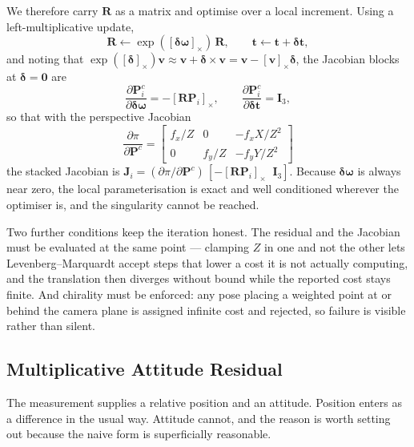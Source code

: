 We therefore carry $\mathbf{R}$ as a matrix and optimise over a local
increment. Using a left-multiplicative update,
\begin{equation}
\mathbf{R} \leftarrow \exp([\boldsymbol{\delta\omega}]_\times)\,\mathbf{R},
\qquad
\mathbf{t} \leftarrow \mathbf{t} + \boldsymbol{\delta t} ,
\label{eq:lm_update}
\end{equation}
and noting that $\exp([\boldsymbol{\delta}]_\times)\mathbf{v} \approx
\mathbf{v} + \boldsymbol{\delta} \times \mathbf{v} = \mathbf{v} -
[\mathbf{v}]_\times \boldsymbol{\delta}$, the Jacobian blocks at
$\boldsymbol{\delta} = \mathbf{0}$ are
\begin{equation}
\frac{\partial \mathbf{P}^c_i}{\partial \boldsymbol{\delta\omega}}
  = -[\mathbf{R}\mathbf{P}_i]_\times ,
\qquad
\frac{\partial \mathbf{P}^c_i}{\partial \boldsymbol{\delta t}} = \mathbf{I}_3 ,
\label{eq:lm_jac}
\end{equation}
so that with the perspective Jacobian
\begin{equation}
\frac{\partial \pi}{\partial \mathbf{P}^c}
= \begin{bmatrix}
f_x / Z & 0 & -f_x X / Z^2 \\
0 & f_y / Z & -f_y Y / Z^2
\end{bmatrix}
\label{eq:proj_jac}
\end{equation}
the stacked Jacobian is
$\mathbf{J}_i = (\partial \pi / \partial \mathbf{P}^c)\,
[-[\mathbf{R}\mathbf{P}_i]_\times \;\; \mathbf{I}_3]$.
Because $\boldsymbol{\delta\omega}$ is always near zero, the local
parameterisation is exact and well conditioned wherever the optimiser is, and
the singularity cannot be reached.

Two further conditions keep the iteration honest. The residual and the
Jacobian must be evaluated at the same point --- clamping $Z$ in one and not
the other lets Levenberg--Marquardt accept steps that lower a cost it is not
actually computing, and the translation then diverges without bound while the
reported cost stays finite. And chirality must be enforced: any pose placing a
weighted point at or behind the camera plane is assigned infinite cost and
rejected, so failure is visible rather than silent.

\subsection{Multiplicative Attitude Residual}
\label{sec:mekf_residual}

The measurement supplies a relative position and an attitude. Position enters
as a difference in the usual way. Attitude cannot, and the reason is worth
setting out because the naive form is superficially reasonable.

